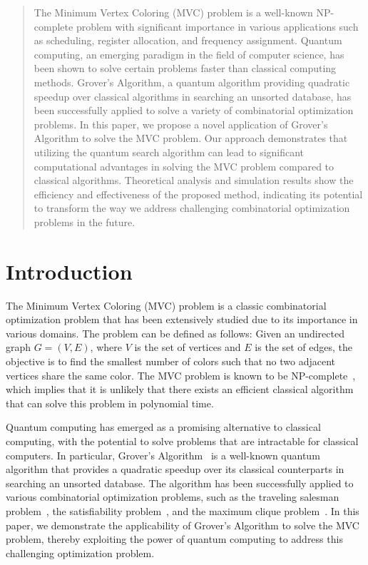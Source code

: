 \begin{abstract}
The Minimum Vertex Coloring (MVC) problem is a well-known NP-complete problem with significant importance in various applications such as scheduling, register allocation, and frequency assignment. Quantum computing, an emerging paradigm in the field of computer science, has been shown to solve certain problems faster than classical computing methods. Grover's Algorithm, a quantum algorithm providing quadratic speedup over classical algorithms in searching an unsorted database, has been successfully applied to solve a variety of combinatorial optimization problems. In this paper, we propose a novel application of Grover's Algorithm to solve the MVC problem. Our approach demonstrates that utilizing the quantum search algorithm can lead to significant computational advantages in solving the MVC problem compared to classical algorithms. Theoretical analysis and simulation results show the efficiency and effectiveness of the proposed method, indicating its potential to transform the way we address challenging combinatorial optimization problems in the future.

\end{abstract}

\section{Introduction}

The Minimum Vertex Coloring (MVC) problem is a classic combinatorial optimization problem that has been extensively studied due to its importance in various domains. The problem can be defined as follows: Given an undirected graph $G = (V, E)$, where $V$ is the set of vertices and $E$ is the set of edges, the objective is to find the smallest number of colors such that no two adjacent vertices share the same color. The MVC problem is known to be NP-complete~\cite{garey1979computers}, which implies that it is unlikely that there exists an efficient classical algorithm that can solve this problem in polynomial time.

Quantum computing has emerged as a promising alternative to classical computing, with the potential to solve problems that are intractable for classical computers. In particular, Grover's Algorithm~\cite{grover1996fast} is a well-known quantum algorithm that provides a quadratic speedup over its classical counterparts in searching an unsorted database. The algorithm has been successfully applied to various combinatorial optimization problems, such as the traveling salesman problem~\cite{durr1996quantum}, the satisfiability problem~\cite{montanaro2015quantum}, and the maximum clique problem~\cite{jiang2017approximate}. In this paper, we demonstrate the applicability of Grover's Algorithm to solve the MVC problem, thereby exploiting the power of quantum computing to address this challenging optimization problem.

